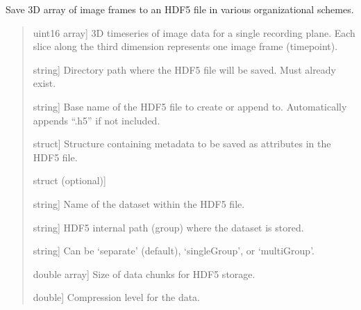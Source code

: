 \documentclass[letterpaper,10pt,english]{sphinxmanual}
\begin{document}
\begin{fulllineitems}
\label{\detokenize{api/utils:planeToH5}}
\pysigstartsignatures
{}
\pysigstopsignatures
\sphinxAtStartPar
Save 3D array of image frames to an HDF5 file in various organizational schemes.
\begin{quote}\begin{description}
\begin{description}
\sphinxlineitem{\sphinxstylestrong{frames}}{[}uint16 array{]}
\sphinxAtStartPar
3D time\sphinxhyphen{}series of image data for a single recording plane.
Each slice along the third dimension represents one image frame (timepoint).

\sphinxlineitem{\sphinxstylestrong{folder}}{[}string{]}
\sphinxAtStartPar
Directory path where the HDF5 file will be saved. Must already exist.

\sphinxlineitem{\sphinxstylestrong{filename}}{[}string{]}
\sphinxAtStartPar
Base name of the HDF5 file to create or append to. Automatically appends “.h5” if not included.

\sphinxlineitem{\sphinxstylestrong{metadata}}{[}struct{]}
\sphinxAtStartPar
Structure containing metadata to be saved as attributes in the HDF5 file.

\sphinxlineitem{\sphinxstylestrong{nvargs}}{[}struct (optional){]}\begin{description}
\begin{description}
\sphinxlineitem{dataset}{[}string{]}
\sphinxAtStartPar
Name of the dataset within the HDF5 file.

\sphinxlineitem{groupPath}{[}string{]}
\sphinxAtStartPar
HDF5 internal path (group) where the dataset is stored.

\sphinxlineitem{fileMode}{[}string{]}
\sphinxAtStartPar
Can be ‘separate’ (default), ‘singleGroup’, or ‘multiGroup’.

\sphinxlineitem{chunksize}{[}double array{]}
\sphinxAtStartPar
Size of data chunks for HDF5 storage.

\sphinxlineitem{compression}{[}double{]}
\sphinxAtStartPar
Compression level for the data.

\end{description}


\end{description}
\end{description}
\end{description}
\end{quote}
\end{fulllineitems}
\end{document}
